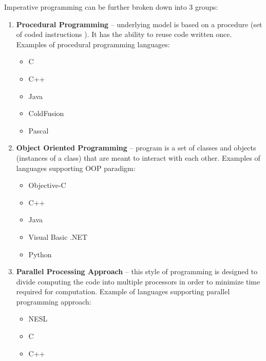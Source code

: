     Imperative programming can be further broken down into 3 groups:
    \begin{enumerate}
        \item \textbf{Procedural Programming} -- underlying model is based on a procedure (set of coded instructions \cite{procedureDefinition}). It has the ability to reuse code written once. Examples of procedural programming languages:
            \begin{itemize}
                \item C
                \item C++
                \item Java
                \item ColdFusion
                \item Pascal
            \end{itemize}
        \item \textbf{Object Oriented Programming} -- program is a set of classes and objects (instances of a class) that are meant to interact with each other. Examples of languages supporting OOP paradigm:
            \begin{itemize}
                \item Objective-C
                \item C++
                \item Java
                \item Visual Basic .NET
                \item Python
            \end{itemize}
        \item \textbf{Parallel Processing Approach} -- this style of programming is designed to divide computing the code into multiple processors in order to minimize time required for computation. Example of languages supporting parallel programming approach:
            \begin{itemize}
                \item NESL
                \item C
                \item C++
            \end{itemize}
    \end{enumerate}
    
